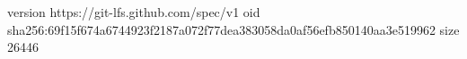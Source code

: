 version https://git-lfs.github.com/spec/v1
oid sha256:69f15f674a6744923f2187a072f77dea383058da0af56efb850140aa3e519962
size 26446
